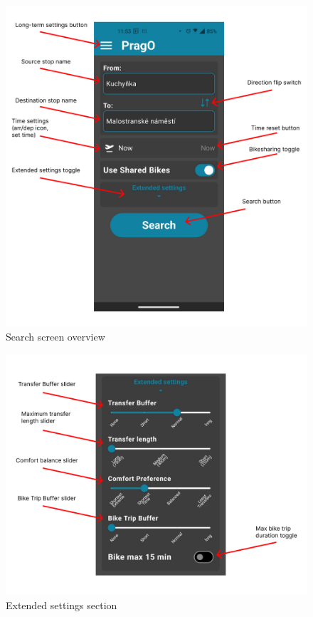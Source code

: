 \begin{figure}[h!]
    \centering
    \includegraphics[width=\textwidth]{img/ui_descriptions/search_screen.pdf}
    \caption{Search screen overview}
    \label{fig:search_screen}
\end{figure}

\begin{figure}[h!]
    \centering
    \includegraphics[width=\textwidth]{img/ui_descriptions/extended_settings.pdf}
    \caption{Extended settings section}
    \label{fig:extended_settings}
\end{figure}

